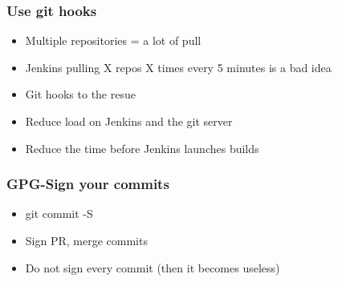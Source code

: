 \begin{frame}
    \frametitle{Use git hooks}
    \begin{itemize}
        \item Multiple repositories = a lot of pull
        \item Jenkins pulling X repos X times every 5 minutes is a bad idea
        \item Git hooks to the resue
        \item Reduce load on Jenkins and the git server
        \item Reduce the time before Jenkins launches builds
    \end{itemize}
\end{frame}
\begin{frame}
    \frametitle{GPG-Sign your commits}
    \begin{itemize}
        \item git commit -S
        \item Sign PR, merge commits
        \item Do not sign every commit (then it becomes useless)
    \end{itemize}
\end{frame}

\thankyouSlide
\renewcommand{\insertLogo}{}
\contactSlide
